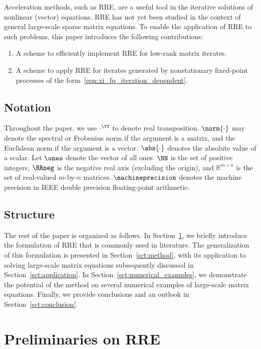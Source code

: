 Acceleration methods, such as \ac{RRE}, are a useful tool in the iterative solutions of nonlinear (vector) equations.
\ac{RRE} has not yet been studied in the context of general large-scale sparse matrix equations.
To enable the application of \ac{RRE} to such problems, this paper introduces the following contributions:
\begin{enumerate}
	\item A scheme to efficiently implement \ac{RRE} for low-rank matrix iterates.
	\item A scheme to apply \ac{RRE} for iterates generated by nonstationary fixed-point processes of the form~\eqref{eqn:xi_fp_iteration_dependent}.
\end{enumerate}

\subsection{Notation}

Throughout the paper, we use $\cdot^\TT$ to denote real transposition.
$\norm{\cdot}$ may denote the spectral or Frobenius norm if the argument is a matrix,
and the Euclidean norm if the argument is a vector.
$\abs{\cdot}$ denotes the absolute value of a scalar.
Let $\ones$ denote the vector of all ones.
$\NN$ is the set of positive integers,
$\RRneg$ is the negative real axis (excluding the origin),
and $\mathbb{R}^{m\times n}$ is the set of real-valued
$m$-by-$n$ matrices.
$\machineprecision$ denotes the machine precision in IEEE double precision floating-point arithmetic.

\subsection{Structure}

The rest of the paper is organized as follows.
In Section~\ref{sct:preliminary}, we briefly introduce the formulation of \ac{RRE} that is commonly used in literature.
The generalization of this formulation is presented in
Section~\ref{sct:method}, with its application to solving large-scale matrix
equations subsequently discussed in Section~\ref{sct:application}.
In Section~\ref{sct:numerical_examples}, we demonstrate the potential of the method on several numerical examples of large-scale matrix equations.
Finally, we provide conclusions and an outlook in Section~\ref{sct:conclusion}.

\section{Preliminaries on RRE}\label{sct:preliminary}

